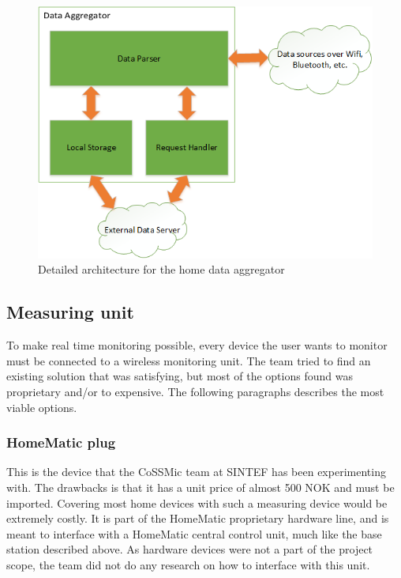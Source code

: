 \begin{figure}[H]
\centering
\includegraphics[height=0.4\textheight]{ch/further/fig/home.png}
\caption{Detailed architecture for the home data aggregator}
\label{fig:aggregator}
\end{figure}

\subsection{Measuring unit}
To make real time monitoring possible, every device the user wants to monitor must be connected to a wireless monitoring unit. The team tried to find an existing solution that was satisfying, but most of the options found was proprietary and/or to expensive. The following paragraphs describes the most viable options.

\subsubsection{HomeMatic plug}
This is the device that the CoSSMic team at SINTEF has been experimenting with. The drawbacks is that it has a unit price of almost 500 NOK and must be imported. Covering most home devices with such a measuring device would be extremely costly. It is part of the HomeMatic proprietary hardware line, and is meant to interface with a HomeMatic central control unit, much like the base station described above. As hardware devices were not a part of the project scope, the team did not do any research on how to interface with this unit. %

